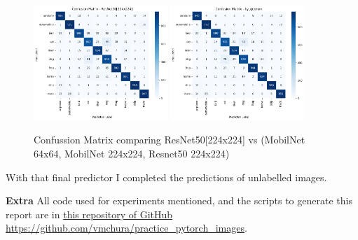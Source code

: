 \documentclass{cpsc202}
\begin{document}
    \begin{figure}[h]
        \caption{Confussion Matrix comparing ResNet50[224x224] vs (MobilNet 64x64, MobilNet 224x224, Resnet50 224x224)}
        \centering
        \includegraphics[width=0.45\textwidth]{confusion_matrix_resnet50}
        \includegraphics[width=0.45\textwidth]{confusion_matrix_by_quorum}
        \label{fig:confussion_matrix_quorum}
    \end{figure}

    With that final predictor I completed the predictions of unlabelled images.

    \large\textbf{Extra}
    All code used for experiments mentioned, and the scripts to generate this report are in \href{https://github.com/vmchura/practice_pytorch_images}{this repository of GitHub https://github.com/vmchura/practice\_pytorch\_images}.
\end{document}
